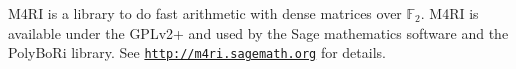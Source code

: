 M4\+R\+I is a library to do fast arithmetic with dense matrices over $\mathbb{F}_2$. M4\+R\+I is available under the G\+P\+Lv2+ and used by the Sage mathematics software and the Poly\+Bo\+Ri library. See \href{http://m4ri.sagemath.org}{\tt http\+://m4ri.\+sagemath.\+org} for details. 